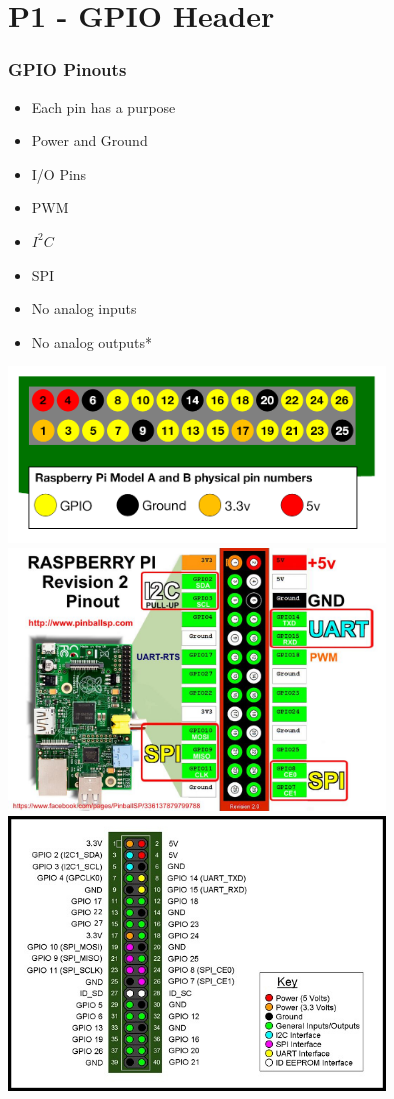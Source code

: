 \documentclass[slidestop,usepdftitle=false,14pt,table]{beamer}
\begin{document}
\section{P1 - GPIO Header}
\begin{frame}[allowframebreaks]
\frametitle{GPIO Pinouts}
\begin{itemize}
\item Each pin has a purpose
\item Power and Ground
\item I/O Pins
\item PWM
\item $I^2C$
\item SPI
\item No analog inputs
\item No analog outputs*
\end{itemize}
\begin{center}
\includegraphics[width=10cm,keepaspectratio]{img/a-and-b-physical-pin-numbers.png}\\
\includegraphics[width=10cm,keepaspectratio]{img/raspberry-pi-rev2-gpio-pinout.jpg}\\
\includegraphics[width=10cm,keepaspectratio]{img/gpio_pinbelegung.jpg}
\end{center}
\end{frame}
\end{document}
